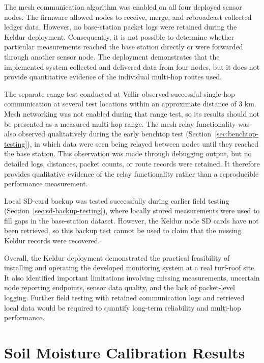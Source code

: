 The mesh communication algorithm was enabled on all four deployed sensor nodes. The firmware allowed nodes to receive, merge, and rebroadcast collected ledger data. However, no base-station packet logs were retained during the Keldur deployment. Consequently, it is not possible to determine whether particular measurements reached the base station directly or were forwarded through another sensor node. The deployment demonstrates that the implemented system collected and delivered data from four nodes, but it does not provide quantitative evidence of the individual multi-hop routes used.

The separate range test conducted at Vellir observed successful single-hop communication at several test locations within an approximate distance of 3 km. Mesh networking was not enabled during that range test, so its results should not be presented as a measured multi-hop range. The mesh relay functionality was also observed qualitatively during the early benchtop test (Section~\ref{sec:benchtop-testing}), in which data were seen being relayed between nodes until they reached the base station. This observation was made through debugging output, but no detailed logs, distances, packet counts, or route records were retained. It therefore provides qualitative evidence of the relay functionality rather than a reproducible performance measurement.

Local SD-card backup was tested successfully during earlier field testing (Section~\ref{sec:sd-backup-testing}), where locally stored measurements were used to fill gaps in the base-station dataset. However, the Keldur node SD cards have not been retrieved, so this backup test cannot be used to claim that the missing Keldur records were recovered.

Overall, the Keldur deployment demonstrated the practical feasibility of installing and operating the developed monitoring system at a real turf-roof site. It also identified important limitations involving missing measurements, uncertain node reporting endpoints, sensor data quality, and the lack of packet-level logging. Further field testing with retained communication logs and retrieved local data would be required to quantify long-term reliability and multi-hop performance.

\section{Soil Moisture Calibration
Results}\label{sec:soil-calibration}

